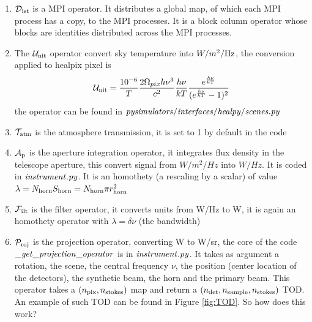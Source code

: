 \documentclass[a4paper, 11pt]{article}
\def\ba{\begin{eqnarray}}
\def\ea{\end{eqnarray}}
\begin{document}
\begin{enumerate}
\item  ${\cal D}_{\rm ist}$ is a MPI operator. It distributes a global map, of which each MPI process has a copy, to the MPI processes. It is a block column operator whose blocks are identities distributed across the MPI processes.
\item The ${\cal U}_{\rm nit} $ operator convert sky temperature into $W / m^2 / {\rm Hz}$, the conversion applied to healpix pixel is 
\ba
{\cal U}_{\rm nit}= \frac{10^{-6}}{T} \frac{2\Omega_{pix}h \nu^{3}}{c^{2}} \frac{h \nu}{k T} \frac{e^{ \frac{h \nu}{k T}}}{(e^{ \frac{h \nu}{k T}}-1)^{2}}
\ea
the operator can be found in  $\it{pysimulators/interfaces/healpy/scenes.py}$
\item ${\cal T}_{\rm atm}$ is the atmosphere transmission, it is set to 1 by default in the code
\item ${\cal A}_{\rm p} $ is the aperture integration operator, it integrates flux density in the telescope aperture, this convert signal from $W / m^2 / Hz$ into $W / Hz$. It is coded in $\it{instrument.py}$. It is an homothety (a rescaling by a scalar) of value $\lambda= N_{\rm horn} S_{\rm horn}= N_{\rm horn} \pi r^{2}_{\rm horn}$ 
\item ${\cal F}_{\rm ilt}$ is the filter operator, it converts units from W/Hz to W, it is again an homothety operator with $\lambda=\delta \nu$ (the bandwidth)
\item $ {\cal P}_{\rm roj}$ is the projection operator, converting  W to W/sr, the core of the code $\it{\_get\_projection\_operator}$ is in $\it{instrument.py}$. It takes as argument a rotation, the scene, the central frequency $\nu$, the position (center location of the detectors), the synthetic beam, the horn and the primary beam. This operator takes a $(n_{\rm pix},n_{\rm stokes})$ map and return a $(n_{\rm det},n_{\rm sample}, n_{\rm stokes})$ TOD. An example of such TOD can be found in Figure \ref{fig:TOD}. So how does this work?


\end{enumerate}
\end{document}
